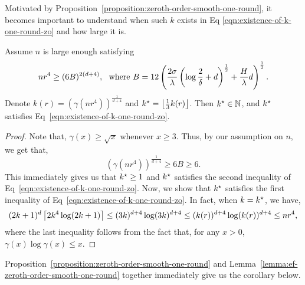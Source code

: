 Motivated by Proposition~\ref{proposition:zeroth-order-smooth-one-round}, 
it becomes important to understand when such $k$ exists in Eq 
\eqref{eqn:existence-of-k-one-round-zo} and how large it is. 

\begin{lemma}
\label{lemma:ef-zeroth-order-smooth-one-round}
Assume $n$ is large enough satisfying 
\begin{equation}
\label{eqn:ef-zeroth-order-smooth-one-round}
nr^4 \geq (6B)^{2(d+4)},~~\text{where}~
	B = 12\left(\frac{2\sigma}{\lambda} 
	\left(\log \frac{2}{\delta} + d\right)^{\frac{1}{2}} + \frac{H}{\lambda}d\right)^{\frac{1}{2}}.
\end{equation}
Denote $k(r)= \left(\gamma\left(nr^4\right)\right)^\frac{1}{d+4}$
and $k^\star = \left\lfloor{\frac{1}{3} k(r)}\right\rfloor$. Then $k^\star\in \mathbb{N}$,
and $k^\star$ satisfies Eq~\eqref{eqn:existence-of-k-one-round-zo}.
\end{lemma}

\begin{proof}
Note that, $\gamma(x) \geq \sqrt{x}$ whenever $x \geq 3$. 
Thus, by our assumption on $n$, we get that, 
\begin{equation*}
\left(\gamma(nr^4)\right)^\frac{1}{d+4} \geq 6B \geq 6.
\end{equation*}
This immediately gives us that $k^\star \geq 1$ and $k^\star$ satisfies the second 
inequality of Eq~\eqref{eqn:existence-of-k-one-round-zo}. Now, we 
show that $k^\star$ satisfies the first inequality of Eq~\eqref{eqn:existence-of-k-one-round-zo}.
In fact, when $k=k^\star$, we have, 
\begin{equation*}
(2k+1)^d \left\lceil{2k^4 \log(2k+1)}\right\rceil \leq (3k)^{d+4} \log (3k)^{d+4} \leq
	 (k(r))^{d+4} \log (k(r))^{d+4} \leq nr^4,
\end{equation*}
where the last inequality follows from the fact that, for any $x > 0$, 
$\gamma(x) \log \gamma(x) \leq x$.
\end{proof}
Proposition~\ref{proposition:zeroth-order-smooth-one-round} and 
Lemma~\ref{lemma:ef-zeroth-order-smooth-one-round} together 
immediately give us the corollary below. 


